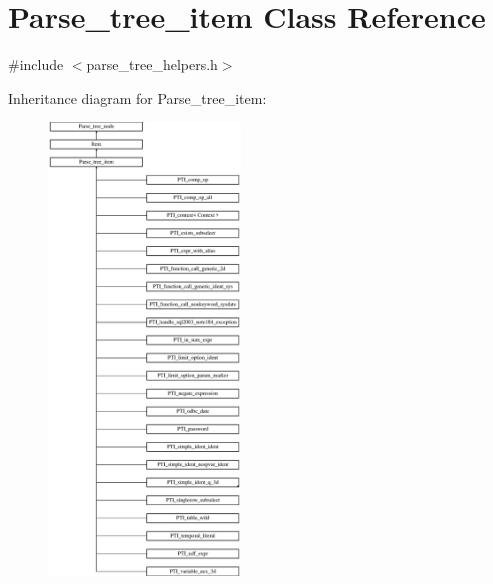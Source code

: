 \hypertarget{classParse__tree__item}{}\section{Parse\+\_\+tree\+\_\+item Class Reference}
\label{classParse__tree__item}


{\ttfamily \#include $<$parse\+\_\+tree\+\_\+helpers.\+h$>$}

Inheritance diagram for Parse\+\_\+tree\+\_\+item\+:\begin{figure}[H]
\begin{center}
\leavevmode
\includegraphics[height=12.000000cm]{classParse__tree__item}
\end{center}
\end{figure}

